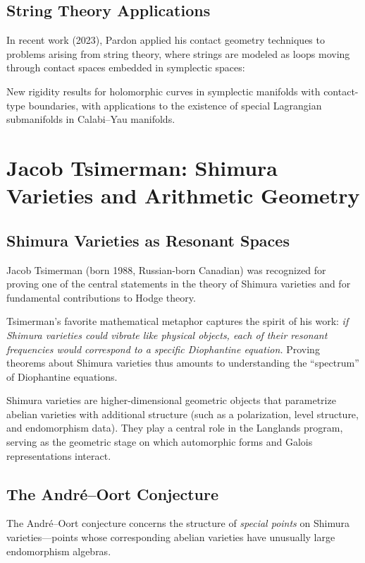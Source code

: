 \subsection{String Theory Applications}
In recent work (2023), Pardon applied his contact geometry techniques to problems arising from string theory, where strings are modeled as loops moving through contact spaces embedded in symplectic spaces:

\begin{theorem}
New rigidity results for holomorphic curves in symplectic manifolds with contact-type boundaries, with applications to the existence of special Lagrangian submanifolds in Calabi--Yau manifolds.
\end{theorem}

\section{Jacob Tsimerman: Shimura Varieties and Arithmetic Geometry}

\subsection{Shimura Varieties as Resonant Spaces}
Jacob Tsimerman (born 1988, Russian-born Canadian) was recognized for proving one of the central statements in the theory of Shimura varieties and for fundamental contributions to Hodge theory.

Tsimerman's favorite mathematical metaphor captures the spirit of his work: \emph{if Shimura varieties could vibrate like physical objects, each of their resonant frequencies would correspond to a specific Diophantine equation.} Proving theorems about Shimura varieties thus amounts to understanding the ``spectrum'' of Diophantine equations.

Shimura varieties are higher-dimensional geometric objects that parametrize abelian varieties with additional structure (such as a polarization, level structure, and endomorphism data). They play a central role in the Langlands program, serving as the geometric stage on which automorphic forms and Galois representations interact.

\subsection{The Andr\'e--Oort Conjecture}
The Andr\'e--Oort conjecture concerns the structure of \emph{special points} on Shimura varieties---points whose corresponding abelian varieties have unusually large endomorphism algebras.

